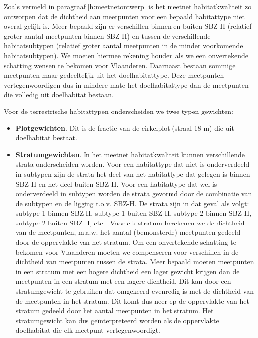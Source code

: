 \documentclass[twoside]{extreport}
\begin{document}
Zoals vermeld in paragraaf \ref{h:meetnetontwerp} is het meetnet
habitatkwaliteit zo ontworpen dat de dichtheid aan meetpunten voor een
bepaald habitattype niet overal gelijk is. Meer bepaald zijn er
verschillen binnen en buiten SBZ-H (relatief groter aantal meetpunten
binnen SBZ-H) en tussen de verschillende habitatsubtypen (relatief
groter aantal meetpunten in de minder voorkomende habitatsubtypen). We
moeten hiermee rekening houden als we een onvertekende schatting wensen
te bekomen voor Vlaanderen. Daarnaast bestaan sommige meetpunten maar
gedeeltelijk uit het doelhabitattype. Deze meetpunten vertegenwoordigen
dus in mindere mate het doelhabitattype dan de meetpunten die volledig
uit doelhabitat bestaan.

Voor de terrestrische habitattypen onderscheiden we twee typen
gewichten:

\begin{itemize}
\tightlist
\item
  \textbf{Plotgewichten}. Dit is de fractie van de cirkelplot (straal 18
  m) die uit doelhabitat bestaat.
\item
  \textbf{Stratumgewichten}. In het meetnet habitatkwaliteit kunnen
  verschillende strata onderscheiden worden. Voor een habitattype dat
  niet is onderverdeeld in subtypen zijn de strata het deel van het
  habitattype dat gelegen is binnen SBZ-H en het deel buiten SBZ-H. Voor
  een habitattype dat wel is onderverdeeld in subtypen worden de strata
  gevormd door de combinatie van de subtypen en de ligging t.o.v. SBZ-H.
  De strata zijn in dat geval als volgt: subtype 1 binnen SBZ-H, subtype
  1 buiten SBZ-H, subtype 2 binnen SBZ-H, subtype 2 buiten SBZ-H,
  etc\ldots{} Voor elk stratum berekenen we de dichtheid van de
  meetpunten, m.a.w. het aantal (bemonsterde) meetpunten gedeeld door de
  oppervlakte van het stratum. Om een onvertekende schatting te bekomen
  voor Vlaanderen moeten we compenseren voor verschillen in de dichtheid
  van meetpunten tussen de strata. Meer bepaald moeten meetpunten in een
  stratum met een hogere dichtheid een lager gewicht krijgen dan de
  meetpunten in een stratum met een lagere dichtheid. Dit kan door een
  stratumgewicht te gebruiken dat omgekeerd evenredig is met de
  dichtheid van de meetpunten in het stratum. Dit komt dus neer op de
  oppervlakte van het stratum gedeeld door het aantal meetpunten in het
  stratum. Het stratumgewicht kan dus geïnterpreteerd worden als de
  oppervlakte doelhabitat die elk meetpunt vertegenwoordigt.
\end{itemize}
\end{document}
